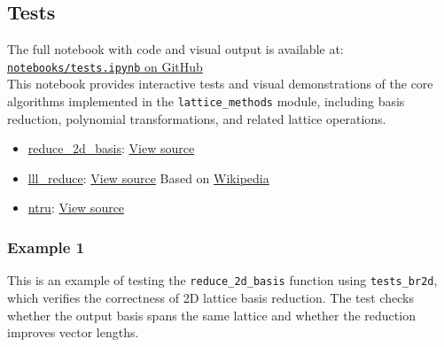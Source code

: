 \documentclass[a4paper,12pt]{article}
\begin{document}


\newpage
\subsection{Tests}
\noindent
The full notebook with code and visual output is available at:\\
\href{https://github.com/SanyaKor/Cryptanalysis/blob/main/notebooks/tests.ipynb}{\texttt{notebooks/tests.ipynb} on GitHub}
\\


This notebook provides interactive tests and visual demonstrations of the core algorithms implemented in the \texttt{lattice\_methods} module, including basis reduction, polynomial transformations, and related lattice operations.

\begin{itemize}
\item
  \hyperref[-2d-lattice-basis-reduction--interactive-notebook]{reduce\_2d\_basis}:
  \href{https://github.com/SanyaKor/Cryptanalysis/blob/main/lattice_methods/basis_reduction_2d.py}{View source}
\item
  \hyperref[-lll-algorithm-wikipedia-based-implementation--tests]{lll\_reduce}:
  \href{https://github.com/SanyaKor/Cryptanalysis/blob/main/lattice_methods/lll.py}{View source} Based on
  \href{https://en.wikipedia.org/wiki/Lenstra%E2%80%93Lenstra%E2%80%93Lov%C3%A1sz_lattice_basis_reduction_algorithm}{Wikipedia}
\item
  \hyperref[ntru--interactive-notebook]{ntru}:
  \href{https://github.com/SanyaKor/Cryptanalysis/blob/main/lattice_methods/ntru.py}{View source}
\end{itemize}


\subsubsection*{Example 1 }\label{example-3-reference}
This is an example of testing the \texttt{reduce\_2d\_basis} function  
using \texttt{tests\_br2d}, which verifies the correctness of 2D lattice basis reduction.  
The test checks whether the output basis spans the same lattice and whether the reduction improves vector lengths.
\end{document}
